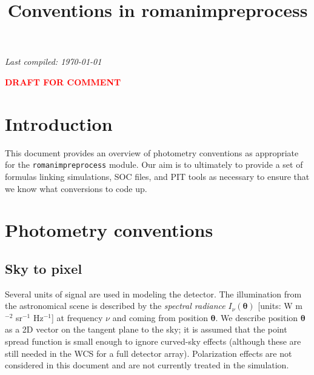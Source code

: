 \documentclass[prd,onecolumn,nofootinbib,nobibnotes]{revtex4}
\begin{document}
\title{Conventions in romanimpreprocess}

\maketitle

\vskip -0.25in
\centerline{\slshape Last compiled: \today}

\tableofcontents

\vskip 0.1in
\centerline{\Large{\textcolor{red}{\bfseries DRAFT FOR COMMENT}}}

\section{Introduction}

This document provides an overview of photometry conventions as appropriate for the {\tt romanimpreprocess} module. Our aim is to ultimately to provide a set of formulas linking simulations, SOC files, and PIT tools as necessary to ensure that we know what conversions to code up.

\section{Photometry conventions}

\subsection{Sky to pixel}

Several units of signal are used in modeling the detector. The illumination from the astronomical scene is described by the {\em spectral radiance} $I_\nu({\boldsymbol\theta})$ [units: W m$^{-2}$ sr$^{-1}$ Hz$^{-1}$] at frequency $\nu$ and coming from position ${\boldsymbol\theta}$. We describe position ${\boldsymbol\theta}$ as a 2D vector on the tangent plane to the sky; it is assumed that the point spread function is small enough to ignore curved-sky effects (although these are still needed in the WCS for a full detector array). Polarization effects are not considered in this document and are not currently treated in the simulation.
\end{document}
